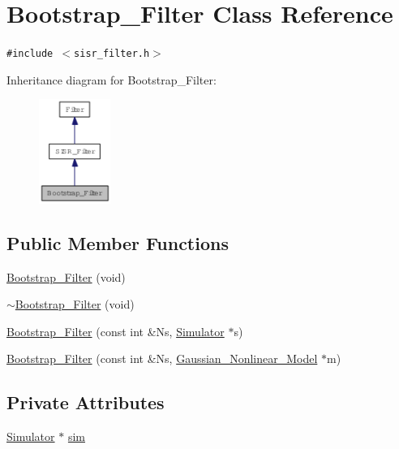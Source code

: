 \hypertarget{class_bootstrap___filter}{
\section{Bootstrap\_\-Filter Class Reference}
\label{class_bootstrap___filter}
}
{\tt \#include $<$sisr\_\-filter.h$>$}

Inheritance diagram for Bootstrap\_\-Filter:\nopagebreak
\begin{figure}[H]
\begin{center}
\leavevmode
\includegraphics[width=66pt]{class_bootstrap___filter__inherit__graph}
\end{center}
\end{figure}
\subsection*{Public Member Functions}
\begin{CompactItemize}
\item 
\hyperlink{class_bootstrap___filter_bdebb4e715920561261919a08c0adbe6}{Bootstrap\_\-Filter} (void)
\item 
\hyperlink{class_bootstrap___filter_95cab25094e2488a9c417a40fc7d4afc}{$\sim$Bootstrap\_\-Filter} (void)
\item 
\hyperlink{class_bootstrap___filter_616427f3269bb6b4e0b23e66e4b748b7}{Bootstrap\_\-Filter} (const int \&Ns, \hyperlink{class_simulator}{Simulator} $\ast$s)
\item 
\hyperlink{class_bootstrap___filter_b6cd1f6d02e6fb00ba41a7b10b03228a}{Bootstrap\_\-Filter} (const int \&Ns, \hyperlink{class_gaussian___nonlinear___model}{Gaussian\_\-Nonlinear\_\-Model} $\ast$m)
\end{CompactItemize}
\subsection*{Private Attributes}
\begin{CompactItemize}
\item 
\hyperlink{class_simulator}{Simulator} $\ast$ \hyperlink{class_bootstrap___filter_5b4cfb2f584027060dff43bc967cb77c}{sim}
\end{CompactItemize}



